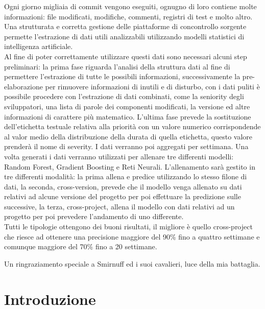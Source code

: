 \documentclass[%
    corpo=12pt,
    twoside,
    oldstyle,
    autoretitolo,
    greek,
    evenboxes,
]{toptesi}
\begin{document}
\frontespizio
\summary
Ogni giorno migliaia di commit vengono eseguiti, ognugno di loro contiene molte informazioni: file modificati, modifiche, commenti, registri di test e molto altro. Una strutturata e corretta gestione delle piattaforme di concontrollo sorgente permette l'estrazione di dati utili analizzabili utilizzando modelli statistici di intelligenza artificiale.\\
Al fine di poter correttamente utilizzare questi dati sono necessari alcuni step preliminari: la prima fase riguarda l'analisi della struttura dati al fine di permettere l'estrazione di tutte le possibili informazioni, successivamente la pre-elaborazione per rimuovere informazioni di inutili e di disturbo, con i dati puliti è possibile procedere con l'estrazione di dati combinati, come la seniority degli sviluppatori, una lista di parole dei componenti modificati, la versione ed altre informazioni di carattere più matematico. L'ultima fase prevede la sostituzione dell'etichetta testuale relativa alla priorità con un valore numerico corrispondende al valor medio della distribuzione della durata di quella etichetta, questo valore prenderà il nome di severity. I dati verranno poi aggregati per settimana.
Una volta generati i dati verranno utilizzati per allenare tre differenti modelli: Random Forest, Gradient Boosting e Reti Neurali. L'allenamento sarà gestito in tre differenti modalità: la prima allena e predice utilizzando lo stesso filone di dati, la seconda, cross-version, prevede che il modello venga allenato su dati relativi ad alcune versione del progetto per poi effettuare la predizione sulle successive, la terza, cross-project, allena il modello con dati relativi ad un progetto per poi prevedere l'andamento di uno differente.\\
Tutti le tipologie ottengono dei buoni risultati, il migliore è quello cross-project che riesce ad ottenere una precisione maggiore del 90\% fino a quattro settimane e comunque maggiore del 70\% fino a 20 settimane.


\acknowledgements

Un ringraziamento speciale a Smirnuff ed i suoi cavalieri, luce della mia battaglia.

\indici

\mainmatter


\chapter{Introduzione}
\label{chap:intro}
\end{document}
